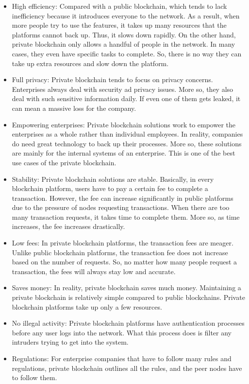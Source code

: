 \begin{itemize}
\item High efficiency: Compared with a public blockchain, which tends to lack inefficiency because it introduces everyone to the network. As a result, when more people try to use the features, it takes up many resources that the platforms cannot back up. Thus, it slows down rapidly. On the other hand, private blockchain only allows a handful of people in the network. In many cases, they even have specific tasks to complete. So, there is no way they can take up extra resources and slow down the platform.
\item Full privacy: Private blockchain tends to focus on privacy concerns. Enterprises always deal with security ad privacy issues. More so, they also deal with such sensitive information daily. If even one of them gets leaked, it can mean a massive loss for the company.
\item Empowering enterprises: Private blockchain solutions work to empower the enterprises as a whole rather than individual employees. In reality, companies do need great technology to back up their processes. More so, these solutions are mainly for the internal systems of an enterprise. This is one of the best use cases of the private blockchain.
\item Stability: Private blockchain solutions are stable. Basically, in every blockchain platform, users have to pay a certain fee to complete a transaction. However, the fee can increase significantly in public platforms due to the pressure of nodes requesting transactions. When there are too many transaction requests, it takes time to complete them. More so, as time increases, the fee increases drastically.
\item Low fees: In private blockchain platforms, the transaction fees are meager. Unlike public blockchain platforms, the transaction fee does not increase based on the number of requests. So, no matter how many people request a transaction, the fees will always stay low and accurate.
\item Saves money: In reality, private blockchain saves much money. Maintaining a private blockchain is relatively simple compared to public blockchains. Private blockchain platforms take up only a few resources.
\item No illegal activity: Private blockchain platforms have authentication processes before any user logs into the network. What this process does is filter any intruders trying to get into the system.
\item Regulations: For enterprise companies that have to follow many rules and regulations, private blockchain outlines all the rules, and the peer nodes have to follow them.
\end{itemize}

